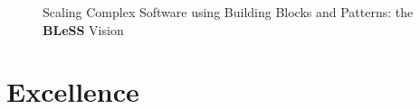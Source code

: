 \documentclass[a4paper,11pt]{article}
\newcommand{\project}[1]{\textbf{#1}\xspace}
\newcommand{\BLESS}{\project{BLeSS}}
\newcommand{\TheProject}{\BLESS}
\begin{document}
\pagebreak

\setcounter{page}{2}


\begin{figure}[tp]
\begin{center}
\begin{center}
\end{center}
\end{center}
\caption{Scaling Complex Software using Building Blocks and Patterns: the \TheProject{} Vision} 
\label{fig:aims}
\end{figure}


\section{Excellence}

\end{document}
